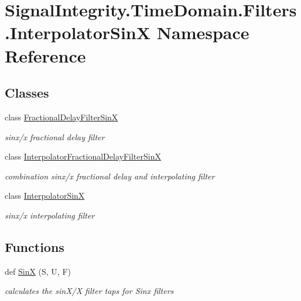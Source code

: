 \hypertarget{namespaceSignalIntegrity_1_1TimeDomain_1_1Filters_1_1InterpolatorSinX}{}\section{Signal\+Integrity.\+Time\+Domain.\+Filters.\+Interpolator\+SinX Namespace Reference}
\label{namespaceSignalIntegrity_1_1TimeDomain_1_1Filters_1_1InterpolatorSinX}
\subsection*{Classes}
\begin{DoxyCompactItemize}
\item 
class \hyperlink{classSignalIntegrity_1_1TimeDomain_1_1Filters_1_1InterpolatorSinX_1_1FractionalDelayFilterSinX}{Fractional\+Delay\+Filter\+SinX}
\begin{DoxyCompactList}\small\item\em sinx/x fractional delay filter \end{DoxyCompactList}\item 
class \hyperlink{classSignalIntegrity_1_1TimeDomain_1_1Filters_1_1InterpolatorSinX_1_1InterpolatorFractionalDelayFilterSinX}{Interpolator\+Fractional\+Delay\+Filter\+SinX}
\begin{DoxyCompactList}\small\item\em combination sinx/x fractional delay and interpolating filter \end{DoxyCompactList}\item 
class \hyperlink{classSignalIntegrity_1_1TimeDomain_1_1Filters_1_1InterpolatorSinX_1_1InterpolatorSinX}{Interpolator\+SinX}
\begin{DoxyCompactList}\small\item\em sinx/x interpolating filter \end{DoxyCompactList}\end{DoxyCompactItemize}
\subsection*{Functions}
\begin{DoxyCompactItemize}
\item 
def \hyperlink{namespaceSignalIntegrity_1_1TimeDomain_1_1Filters_1_1InterpolatorSinX_aa77f169f9a12eba766c2ffeafe467c5f}{SinX} (S, U, F)
\begin{DoxyCompactList}\small\item\em calculates the sin\+X/X filter taps for Sinx filters \end{DoxyCompactList}\end{DoxyCompactItemize}


